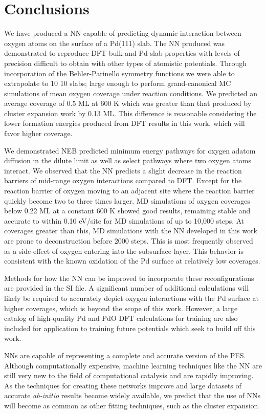 \documentclass[12pt]{cmuthesis}
\begin{document}
\section{Conclusions}
\label{sec:org1e47876}
We have produced a NN capable of predicting dynamic interaction between oxygen atoms on the surface of a Pd(111) slab. The NN produced was demonstrated to reproduce DFT bulk and Pd slab properties with levels of precision difficult to obtain with other types of atomistic potentials. Through incorporation of the Behler-Parinello symmetry functions we were able to extrapolate to 10 \texttimes{} 10 slabs; large enough to perform grand-canonical MC simulations of mean oxygen coverage under reaction conditions. We predicted an average coverage of 0.5 ML at 600 K which was greater than that produced by cluster expansion work by 0.13 ML. This difference is reasonable considering the lower formation energies produced from DFT results in this work, which will favor higher coverage.

We demonstrated NEB predicted minimum energy pathways for oxygen adatom diffusion in the dilute limit as well as select pathways where two oxygen atoms interact. We observed that the NN predicts a slight decrease in the reaction barriers of mid-range oxygen interactions compared to DFT. Except for the reaction barrier of oxygen moving to an adjacent site where the reaction barrier quickly become two to three times larger. MD simulations of oxygen coverages below 0.22 ML at a constant 600 K showed good results, remaining stable and accurate to within 0.10 eV/site for MD simulations of up to 10,000 steps. At coverages greater than this, MD simulations with the NN developed in this work are prone to deconstruction before 2000 steps. This is most frequently observed as a side-effect of oxygen entering into the subsurface layer. This behavior is consistent with the known oxidation of the Pd surface at relatively low coverages.

Methods for how the NN can be improved to incorporate these reconfigurations are provided in the SI file. A significant number of additional calculations will likely be required to accurately depict oxygen interactions with the Pd surface at higher coverages, which is beyond the scope of this work. However, a large catalog of high-quality Pd and PdO DFT calculations for training are also included for application to training future potentials which seek to build off this work.

NNs are capable of representing a complete and accurate version of the PES. Although computationally expensive, machine learning techniques like the NN are still very new to the field of computational catalysis and are rapidly improving. As the techniques for creating these networks improve and large datasets of accurate \emph{ab-initio} results become widely available, we predict that the use of NNs will become as common as other fitting techniques, such as the cluster expansion.
\end{document}
